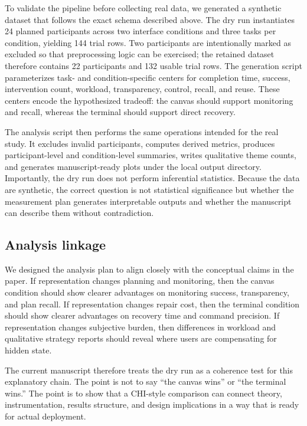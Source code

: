 \documentclass[sigconf]{acmart}
\begin{document}
To validate the pipeline before collecting real data, we generated a synthetic dataset that follows the exact schema described above. The dry run instantiates 24 planned participants across two interface conditions and three tasks per condition, yielding 144 trial rows. Two participants are intentionally marked as excluded so that preprocessing logic can be exercised; the retained dataset therefore contains 22 participants and 132 usable trial rows. The generation script parameterizes task- and condition-specific centers for completion time, success, intervention count, workload, transparency, control, recall, and reuse. These centers encode the hypothesized tradeoff: the canvas should support monitoring and recall, whereas the terminal should support direct recovery.

The analysis script then performs the same operations intended for the real study. It excludes invalid participants, computes derived metrics, produces participant-level and condition-level summaries, writes qualitative theme counts, and generates manuscript-ready plots under the local output directory. Importantly, the dry run does not perform inferential statistics. Because the data are synthetic, the correct question is not statistical significance but whether the measurement plan generates interpretable outputs and whether the manuscript can describe them without contradiction.

\subsection{Analysis linkage}

We designed the analysis plan to align closely with the conceptual claims in the paper. If representation changes planning and monitoring, then the canvas condition should show clearer advantages on monitoring success, transparency, and plan recall. If representation changes repair cost, then the terminal condition should show clearer advantages on recovery time and command precision. If representation changes subjective burden, then differences in workload and qualitative strategy reports should reveal where users are compensating for hidden state.

The current manuscript therefore treats the dry run as a coherence test for this explanatory chain. The point is not to say ``the canvas wins'' or ``the terminal wins.'' The point is to show that a CHI-style comparison can connect theory, instrumentation, results structure, and design implications in a way that is ready for actual deployment.
\end{document}
